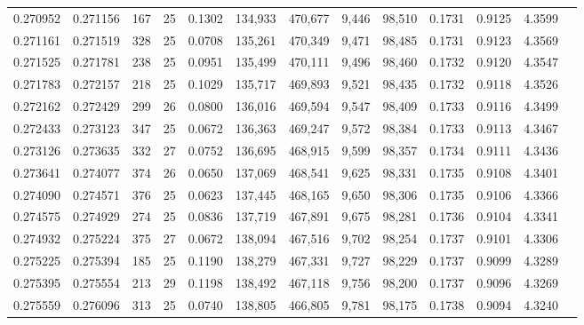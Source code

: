 \begin{tabular}{rrrrrrrrrrrrr}
0.270952 & 0.271156 &   167 &  25 &                                     0.1302 & 134,933 & 470,677 &   9,446 &  98,510 & 0.1731 & 0.9125 & 4.3599 \\
0.271161 & 0.271519 &   328 &  25 &                                     0.0708 & 135,261 & 470,349 &   9,471 &  98,485 & 0.1731 & 0.9123 & 4.3569 \\
0.271525 & 0.271781 &   238 &  25 &                                     0.0951 & 135,499 & 470,111 &   9,496 &  98,460 & 0.1732 & 0.9120 & 4.3547 \\
0.271783 & 0.272157 &   218 &  25 &                                     0.1029 & 135,717 & 469,893 &   9,521 &  98,435 & 0.1732 & 0.9118 & 4.3526 \\
0.272162 & 0.272429 &   299 &  26 &                                     0.0800 & 136,016 & 469,594 &   9,547 &  98,409 & 0.1733 & 0.9116 & 4.3499 \\
0.272433 & 0.273123 &   347 &  25 &                                     0.0672 & 136,363 & 469,247 &   9,572 &  98,384 & 0.1733 & 0.9113 & 4.3467 \\
0.273126 & 0.273635 &   332 &  27 &                                     0.0752 & 136,695 & 468,915 &   9,599 &  98,357 & 0.1734 & 0.9111 & 4.3436 \\
0.273641 & 0.274077 &   374 &  26 &                                     0.0650 & 137,069 & 468,541 &   9,625 &  98,331 & 0.1735 & 0.9108 & 4.3401 \\
0.274090 & 0.274571 &   376 &  25 &                                     0.0623 & 137,445 & 468,165 &   9,650 &  98,306 & 0.1735 & 0.9106 & 4.3366 \\
0.274575 & 0.274929 &   274 &  25 &                                     0.0836 & 137,719 & 467,891 &   9,675 &  98,281 & 0.1736 & 0.9104 & 4.3341 \\
0.274932 & 0.275224 &   375 &  27 &                                     0.0672 & 138,094 & 467,516 &   9,702 &  98,254 & 0.1737 & 0.9101 & 4.3306 \\
0.275225 & 0.275394 &   185 &  25 &                                     0.1190 & 138,279 & 467,331 &   9,727 &  98,229 & 0.1737 & 0.9099 & 4.3289 \\
0.275395 & 0.275554 &   213 &  29 &                                     0.1198 & 138,492 & 467,118 &   9,756 &  98,200 & 0.1737 & 0.9096 & 4.3269 \\
0.275559 & 0.276096 &   313 &  25 &                                     0.0740 & 138,805 & 466,805 &   9,781 &  98,175 & 0.1738 & 0.9094 & 4.3240 \\

\end{tabular}

